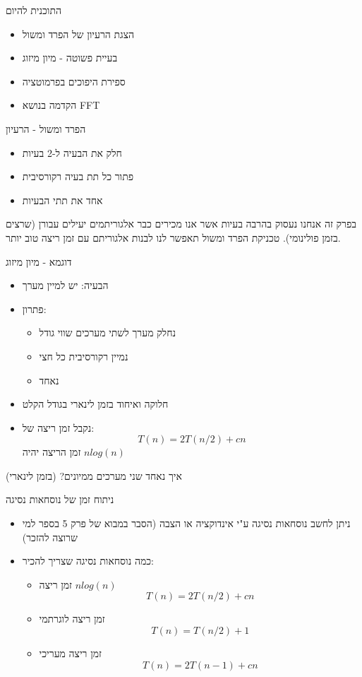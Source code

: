 \documentclass[luatex]{beamer}
\newcommand{\E}[1]{\foreignlanguage{english}{\fontspec{Open Sans}#1}}
\begin{document}
\begin{frame}{התוכנית להיום}
\pause
\begin{itemize}[<+->]
	\item הצגת הרעיון של הפרד ומשול
	\item בעיית פשוטה - מיון מיזוג
	\item ספירת היפוכים בפרמוטציה
	\item הקדמה בנושא FFT
\end{itemize}
\end{frame}

\begin{frame}{הפרד ומשול - הרעיון}
\pause
\begin{itemize}[<+->]
	\item  חלק את הבעיה ל-2 בעיות
	\item פתור כל תת בעיה רקורסיבית
	\item אחד את תתי הבעיות
\end{itemize}
\pause
בפרק זה אנחנו נעסוק בהרבה בעיות אשר אנו מכירים כבר אלגוריתמים יעילים עבורן (שרצים בזמן פולינומי). טכניקת הפרד ומשול תאפשר לנו לבנות אלגוריתם עם זמן ריצה טוב יותר.
\end{frame}
\begin{frame}{דוגמא - מיון מיזוג}
\pause
\begin{itemize}[<+->]
	\item הבעיה: יש למיין מערך
	\item פתרון:
	\pause
	\begin{itemize}[<+->]
		\item נחלק מערך לשתי מערכים שווי גודל
		\item נמיין רקורסיבית כל חצי
		\item נאחד
	\end{itemize}
	\item חלוקה ואיחוד בזמן לינארי בגודל הקלט
	\item נקבל זמן ריצה של:
	$$T(n)=2T(n/2) +cn$$
	זמן הריצה יהיה \E{$nlog(n)$}
\end{itemize}
\end{frame}
\begin{frame}{איך נאחד שני מערכים ממיונים? (בזמן לינארי)}

\end{frame}
\begin{frame}{ניתוח זמן של נוסחאות נסיגה}
\pause
\begin{itemize}[<+->]
	\item ניתן לחשב נוסחאות נסיגה ע"י אינדוקציה או הצבה (הסבר במבוא של פרק 5 בספר למי שרוצה להזכר)
	\item כמה נוסחאות נסיגה שצריך להכיר:
	\pause
	\begin{itemize}[<+->]
		\item זמן ריצה \E{$nlog(n)$}
		$$T(n)=2T(n/2) +cn$$
		\item זמן ריצה לוגרתמי
		$$T(n)=T(n/2) +1$$
		\item זמן ריצה מעריכי
		$$T(n)=2T(n-1) +cn$$
	\end{itemize}
\end{itemize}
\end{frame}
\end{document}
